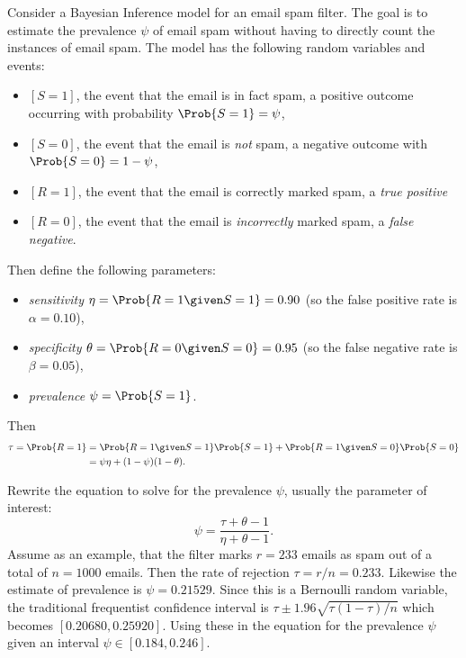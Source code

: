 \documentclass[12pt]{article}
\begin{document}
Consider a Bayesian Inference model for an email spam filter. The goal
is to estimate the prevalence \( \psi \) of email spam without having to
directly count the instances of email spam.  The model has the following
random variables and events:
\begin{itemize}
    \item
        \( [S=1] \), the event that the email is in fact spam, a
        positive outcome occurring with probability \( \Prob{S=1} = \psi
        \),
    \item
        \( [S=0] \), the event that the email is \emph{not} spam, a
        negative outcome with \( \Prob{S = 0} = 1 - \psi \),
    \item
        \( [R=1] \), the event that the email is correctly marked spam,
        a \emph{true positive}
    \item
        \( [R=0] \), the event that the email is \emph{incorrectly}
        marked spam, a \emph{false negative}.
\end{itemize}
Then define the following parameters:
\begin{itemize}
    \item
        \emph{sensitivity} \( \eta = \Prob{R = 1 \given S =1} = 0.90 \) (so
        the false positive rate is \( \alpha = 0.10 \)),
    \item
        \emph{specificity} \( \theta = \Prob{R = 0 \given S = 0} = 0.95 \)
        (so the false negative rate is \( \beta = 0.05 \)),
    \item
        \emph{prevalence} \( \psi = \Prob{S = 1} \).
\end{itemize}
Then
\begin{align*}
    \tau = \Prob{R = 1} &= \Prob{R = 1 \given S =1} \Prob{S = 1} + \Prob{R
                          = 1 \given S =0} \Prob{S = 0} \\
                        &= \psi \eta + (1 - \psi)(1-\theta).
\end{align*}

Rewrite the equation to solve for the prevalence \( \psi \), usually the
parameter of interest:
\[
    \psi = \frac{\tau + \theta - 1}{\eta + \theta -1}.
\] Assume as an example, that the filter marks \( r = 233 \) emails as
spam out of a total of \( n = 1000 \) emails.  Then the rate of
rejection \( \tau = r/n = 0.233 \).  Likewise the estimate of prevalence
is \( \psi = 0.21529 \). Since this is a Bernoulli random variable, the
traditional frequentist confidence interval is \( \tau \pm 1.96 \sqrt{\tau
(1-\tau)/n} \) which becomes \( [0.20680, 0.25920] \).  Using these in
the equation for the prevalence \( \psi \) given an interval \( \psi \in
[0.184, 0.246] \).
\end{document}
